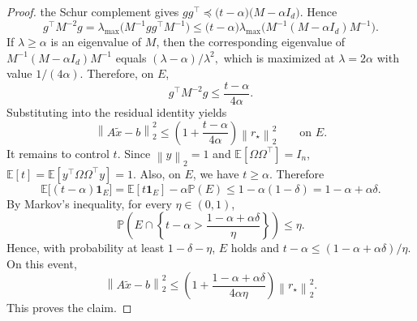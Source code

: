 \documentclass[10pt,a4paper]{amsart}
\newcommand{\E}{\mathbb{E}}
\newcommand{\Prob}{\mathbb{P}}
\newcommand{\norm}[1]{\left\lVert #1 \right\rVert}
\begin{document}
\begin{proof}
the Schur complement gives
$
gg^\top \preceq \bigl(t- \alpha \bigr)\bigl(M- \alpha I_d\bigr).
$
Hence
\[
g^\top M^{-2}g
=
\lambda_{\max}\!\bigl(M^{-1}gg^\top M^{-1}\bigr)
\le
\bigl(t- \alpha \bigr)
\lambda_{\max}\!\bigl(M^{-1}(M- \alpha I_d)M^{-1}\bigr).
\]
If $\lambda\ge  \alpha $ is an eigenvalue of $M$, then the corresponding eigenvalue of
$M^{-1}(M- \alpha I_d)M^{-1}$ equals
$
(\lambda- \alpha )/\lambda^2,
$
which is maximized at $\lambda=2 \alpha $ with value $1/(4 \alpha )$. Therefore,
on $E$,
\[
g^\top M^{-2}g \le \frac{t- \alpha }{4 \alpha }.
\]
Substituting into the residual identity yields
\[
\norm{A\widetilde x-b}_2^2
\le
\left(1+\frac{t- \alpha }{4 \alpha }\right)\norm{r_\star}_2^2
\qquad \text{on } E.
\]
It remains to control $t$. Since $\norm{y}_2=1$ and $\E[\Omega\Omega^\top]=I_n$,
$
\E[t] = \E[y^\top\Omega\Omega^\top y] = 1.
$
Also, on $E$, we have $t\ge  \alpha $. Therefore
\[
\E\bigl[(t- \alpha )\mathbf 1_E\bigr]
=
\E[t\mathbf 1_E] -  \alpha \Prob(E)
\le
1- \alpha (1-\delta)
=
1- \alpha + \alpha \delta.
\]
By Markov's inequality, for every $\eta\in(0,1)$,
\[
\Prob\!\left(
E \cap
\left\{
t- \alpha  > \frac{1- \alpha + \alpha \delta}{\eta}
\right\}
\right)
\le \eta.
\]
Hence, with probability at least $1-\delta-\eta$,  $E$ holds and
$
t- \alpha  \le (1- \alpha + \alpha \delta)/\eta.
$
On this event,
\[
\norm{A\widetilde x-b}_2^2
\le
\left(1+\frac{1- \alpha + \alpha \delta}{4 \alpha \eta}\right)\norm{r_\star}_2^2.
\]
This proves the claim. 
\end{proof}
\end{document}
